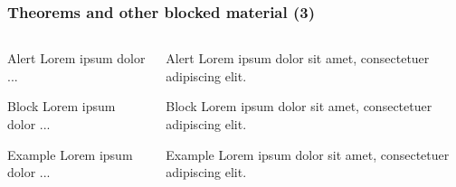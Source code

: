 \documentclass[aspectratio=1610]{beamer}
\begin{document}
\begin{frame}[fragile]
  \frametitle{Theorems and other blocked material (3)}
  \begin{columns}[onlytextwidth]
    \begin{column}{0.45\textwidth}
\begin{CodeBox}{}
\begin{alertblock}{Alert}
  Lorem ipsum dolor ...
\end{alertblock}
\end{CodeBox}

\begin{CodeBox}{}
\begin{block}{Block}
  Lorem ipsum dolor ...
\end{block}
\end{CodeBox}

\begin{CodeBox}{}
\begin{exampleblock}{Example}
  Lorem ipsum dolor ...
\end{exampleblock}
\end{CodeBox}
    \end{column}\textwidth%
    \begin{column}{0.5\textwidth}
      \begin{alertblock}{Alert}
        Lorem ipsum dolor sit amet, consectetuer adipiscing elit.
      \end{alertblock}
      \begin{block}{Block}
        Lorem ipsum dolor sit amet, consectetuer adipiscing elit.
      \end{block}
      \begin{exampleblock}{Example}
        Lorem ipsum dolor sit amet, consectetuer adipiscing elit.
      \end{exampleblock}
    \end{column}
  \end{columns}
\end{frame}
\end{document}
